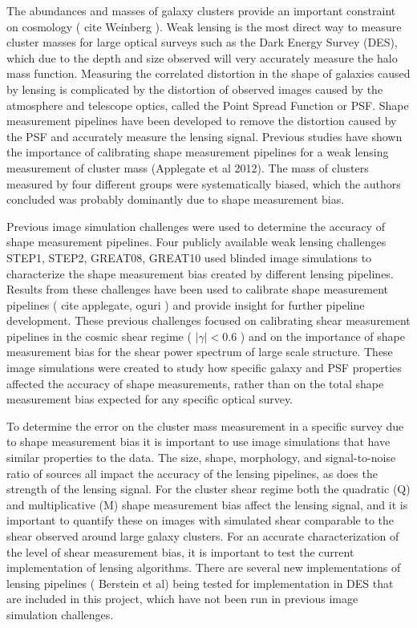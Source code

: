 The abundances and masses of galaxy clusters provide an important constraint on 
cosmology ( cite Weinberg ). Weak lensing is the most direct way to measure cluster
masses for large optical surveys such as the Dark Energy Survey (DES), which due to the depth and
size observed will very accurately measure the halo mass function.
Measuring the correlated distortion in the shape of galaxies caused by lensing is complicated
by the distortion of observed images caused by the atmosphere and telescope optics, called the 
Point Spread Function or PSF. Shape measurement pipelines have been developed to remove the 
distortion caused by the PSF and accurately measure the lensing signal. Previous studies have 
shown the importance of calibrating shape measurement pipelines for a weak lensing
measurement of cluster mass (Applegate et al 2012). The mass of clusters measured by four different 
groups were systematically biased, which the authors concluded was probably dominantly due 
to shape measurement bias.

Previous image simulation challenges were used to determine the accuracy of shape measurement pipelines. 
Four publicly available weak lensing challenges STEP1, STEP2, GREAT08, GREAT10 used blinded image
simulations to characterize the shape measurement bias created by different lensing pipelines. Results from these challenges have been used to calibrate shape measurement pipelines ( cite applegate, oguri ) and provide insight for further pipeline development. These previous challenges focused on calibrating shear measurement pipelines in the cosmic shear regime ( $| \gamma | < 0.6$ ) and on the importance
of shape measurement bias for the shear power spectrum of large scale structure. These image simulations
were created to study how specific galaxy and PSF properties affected the accuracy of 
shape measurements, rather than on the total shape measurement bias expected for any specific 
optical survey.

To determine the error on the cluster mass measurement in a specific survey due to shape measurement bias it is important to use image simulations that have similar properties to the data. 
The size, shape, morphology, and signal-to-noise ratio of sources all impact the accuracy of the 
lensing pipelines, as does the strength of the lensing signal. For the cluster shear regime
both the quadratic (Q) and multiplicative (M) shape measurement bias affect the lensing signal, and
it is important to quantify these on images with simulated shear comparable to the shear observed around large galaxy clusters. For an accurate characterization of the level of shear measurement bias, it is important to test the current implementation of lensing algorithms. There are several new implementations
of lensing pipelines ( Berstein et al) being tested for implementation in DES that are included in this project, which have not been run in previous image simulation challenges.
 
